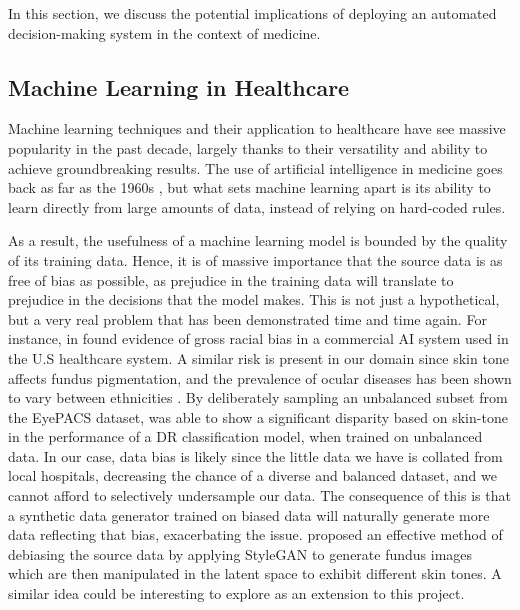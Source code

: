In this section, we discuss the potential implications of deploying an automated decision-making system in the context of medicine.

\subsection{Machine Learning in Healthcare}

Machine learning techniques and their application to healthcare have see massive popularity in the past decade, largely thanks to their versatility and ability to achieve groundbreaking results.
The use of artificial intelligence in medicine goes back as far as the 1960s \cite{dendral}, but what sets machine learning apart is its ability to learn directly from large amounts of data, instead of relying on hard-coded rules.

As a result, the usefulness of a machine learning model is bounded by the quality of its training data.
Hence, it is of massive importance that the source data is as free of bias as possible, as prejudice in the training data will translate to prejudice in the decisions that the model makes.
This is not just a hypothetical, but a very real problem that has been demonstrated time and time again.
For instance, in \citeyear{Obermeyer447} \citeauthor{Obermeyer447} \cite{Obermeyer447} found evidence of gross racial bias in a commercial AI system used in the U.S healthcare system.
A similar risk is present in our domain since skin tone affects fundus pigmentation, and the prevalence of ocular diseases has been shown to vary between ethnicities \cite{bourne2011}.
By deliberately sampling an unbalanced subset from the EyePACS dataset, \citeauthor{burlina2020addressing} \cite{burlina2020addressing} was able to show a significant disparity based on skin-tone in the performance of a DR classification model, when trained on unbalanced data.
In our case, data bias is likely since the little data we have is collated from local hospitals, decreasing the chance of a diverse and balanced dataset, and we cannot afford to selectively undersample our data.
The consequence of this is that a synthetic data generator trained on biased data will naturally generate more data reflecting that bias, exacerbating the issue.
\citeauthor{burlina2020addressing} proposed an effective method of debiasing the source data by applying StyleGAN to generate fundus images which are then manipulated in the latent space to exhibit different skin tones.
A similar idea could be interesting to explore as an extension to this project.


